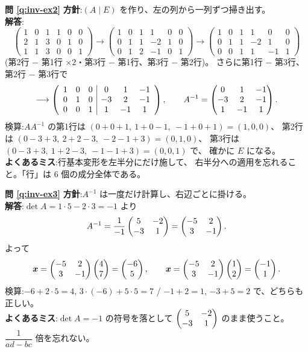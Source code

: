 \bigskip
\noindent\textbf{問 \ref{q:inv-ex2}}\quad
\textbf{方針}:$(A \mid E)$ を作り、左の列から一列ずつ掃き出す。\\
\textbf{解答}:
\[
\left(\begin{array}{ccc|ccc}
1 & 0 & 1 & 1 & 0 & 0 \\
2 & 1 & 3 & 0 & 1 & 0 \\
1 & 1 & 3 & 0 & 0 & 1
\end{array}\right)
\longrightarrow
\left(\begin{array}{ccc|ccc}
1 & 0 & 1 & 1 & 0 & 0 \\
0 & 1 & 1 & -2 & 1 & 0 \\
0 & 1 & 2 & -1 & 0 & 1
\end{array}\right)
\longrightarrow
\left(\begin{array}{ccc|ccc}
1 & 0 & 1 & 1 & 0 & 0 \\
0 & 1 & 1 & -2 & 1 & 0 \\
0 & 0 & 1 & 1 & -1 & 1
\end{array}\right)
\]
(第2行 $-$ 第1行 $\times 2$・第3行 $-$ 第1行、第3行 $-$ 第2行)。
さらに第1行 $-$ 第3行、第2行 $-$ 第3行で
\[
\longrightarrow
\left(\begin{array}{ccc|ccc}
1 & 0 & 0 & 0 & 1 & -1 \\
0 & 1 & 0 & -3 & 2 & -1 \\
0 & 0 & 1 & 1 & -1 & 1
\end{array}\right),
\qquad
A^{-1} = \begin{pmatrix}0 & 1 & -1 \\ -3 & 2 & -1 \\ 1 & -1 & 1\end{pmatrix}.
\]
検算:$AA^{-1}$ の第1行は $(0 + 0 + 1,\ 1 + 0 - 1,\ -1 + 0 + 1) = (1, 0, 0)$、
第2行は $(0 - 3 + 3,\ 2 + 2 - 3,\ -2 - 1 + 3) = (0, 1, 0)$、
第3行は $(0 - 3 + 3,\ 1 + 2 - 3,\ -1 - 1 + 3) = (0, 0, 1)$ で、
確かに $E$ になる。\\
\textbf{よくあるミス}:行基本変形を左半分にだけ施して、
右半分への適用を忘れること。「行」は $6$ 個の成分全体である。

\bigskip
\noindent\textbf{問 \ref{q:inv-ex3}}\quad
\textbf{方針}:$A^{-1}$ は一度だけ計算し、右辺ごとに掛ける。\\
\textbf{解答}:$\det A = 1 \cdot 5 - 2 \cdot 3 = -1$ より
\[
A^{-1} = \frac{1}{-1}\begin{pmatrix}5 & -2 \\ -3 & 1\end{pmatrix} = \begin{pmatrix}-5 & 2 \\ 3 & -1\end{pmatrix}.
\]
よって
\[
\bm{x} = \begin{pmatrix}-5 & 2 \\ 3 & -1\end{pmatrix}\begin{pmatrix}4 \\ 7\end{pmatrix} = \begin{pmatrix}-6 \\ 5\end{pmatrix},
\qquad
\bm{x} = \begin{pmatrix}-5 & 2 \\ 3 & -1\end{pmatrix}\begin{pmatrix}1 \\ 2\end{pmatrix} = \begin{pmatrix}-1 \\ 1\end{pmatrix}.
\]
検算:$-6 + 2 \cdot 5 = 4$, $3 \cdot (-6) + 5 \cdot 5 = 7$ /
$-1 + 2 = 1$, $-3 + 5 = 2$ で、どちらも正しい。\\
\textbf{よくあるミス}:$\det A = -1$ の符号を落として
$\begin{pmatrix}5 & -2 \\ -3 & 1\end{pmatrix}$ のまま使うこと。$\dfrac{1}{ad - bc}$ 倍を忘れない。

